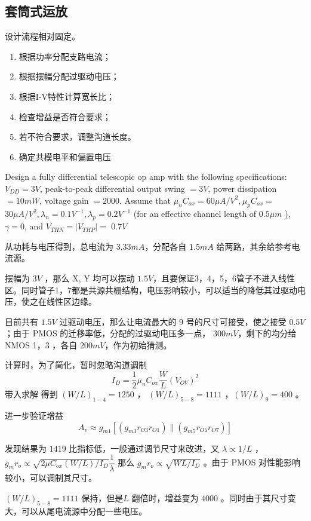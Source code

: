 \documentclass[cn,11pt,chinese,black,simple]{../elegantbook}
\begin{document}


\subsection{套筒式运放}

设计流程相对固定。


\begin{enumerate}
    \item 根据功率分配支路电流；
    \item 根据摆幅分配过驱动电压；
    \item 根据I-V特性计算宽长比；
    \item 检查增益是否符合要求；
    \item 若不符合要求，调整沟道长度。
    \item 确定共模电平和偏置电压
\end{enumerate}

\begin{example}
    Design a fully differential telescopic op amp with the following specifications: \(V_{D D}=3 V\), peak-to-peak differential output swing \(=3 V\), power dissipation \(=10 mW\), voltage gain \(=2000 .\) Assume that \(\mu_{n} C_{o x}=60 \mu A / V ^{2}, \mu_{p} C_{o x}=\) \(30 \mu A / V ^{2}, \lambda_{n}=0.1 V ^{-1}, \lambda_{p}=0.2 V ^{-1}\) (for an effective channel length of \(0.5 \mu m\) ), \(\gamma=0\), and \(V_{T H N}=\left|V_{T H P}\right|=\)
\(0.7 V\)
\end{example}

\begin{solution}
    从功耗与电压得到，总电流为 \(3.33 mA\)，分配各自 \(1.5 mA\) 给两路，其余给参考电流源。

    摆幅为 \(3 V\) ，那么 X, Y 均可以摆动 \(1.5 V\)，且要保证3，4，5，6管子不进入线性区。同时管子1，7都是共源共栅结构，电压影响较小，可以适当的降低其过驱动电压，使之在线性区边缘。
    
    目前共有 \(1.5 V\) 过驱动电压，那么让电流最大的 9 号的尺寸可接受，使之接受 \(0.5 V\)；由于 PMOS 的迁移率低，分配的过驱动电压多一点， \(300 mV\)，剩下的均分给 NMOS 1，3 ，各自 \(200 mV\)，作为初始猜测。

    计算时，为了简化，暂时忽略沟道调制 \[I_D = \dfrac{1}{2} \mu_n C_{ox} \dfrac{W}{L} (V_{OV})^2\]
    带入求解 得到 \((W/L)_{1-4} = 1250\) ， \((W/L)_{5-8} = 1111\) ，\((W/L)_9 = 400\) 。

    进一步验证增益 \[A_{v} \approx g_{m 1}\left[\left(g_{m 3} r_{O 3} r_{O 1}\right) \|\left(g_{m 5} r_{O 5} r_{O 7}\right)\right]\] 

    发现结果为 \(1419\) 比指标低，一般通过调节尺寸来改进，又 \(\lambda \propto 1/L\) ，\(g_m r_o \propto \sqrt{2 \mu C_{ox} (W/L)/I_D} \dfrac{1}{\lambda} \) 那么 \( g_m r_o \propto \sqrt{W L / I_D}\) 。由于 PMOS 对性能影响较小，可以调制其尺寸。

    \((W/L)_{5-8} = 1111\) 保持，但是\(L\) 翻倍时，增益变为 \(4000\) 。同时由于其尺寸变大，可以从尾电流源中分配一些电压。


\end{solution}
\end{document}
